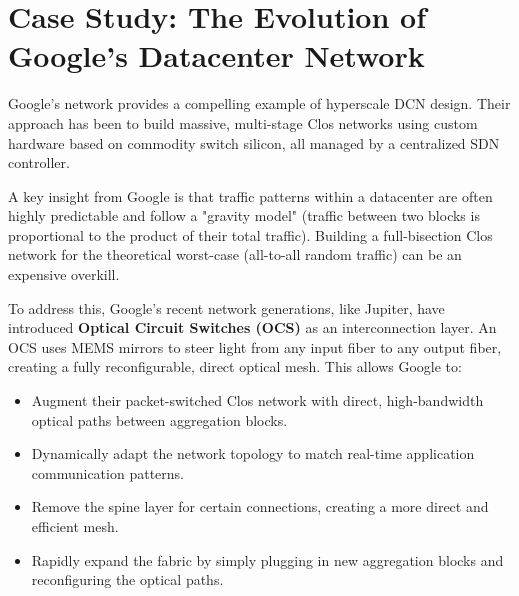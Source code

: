 \section{Case Study: The Evolution of Google's Datacenter Network}
Google's network provides a compelling example of hyperscale DCN design. Their approach has been to build massive, multi-stage Clos networks using custom hardware based on commodity switch silicon, all managed by a centralized SDN controller.


A key insight from Google is that traffic patterns within a datacenter are often highly predictable and follow a "gravity model" (traffic between two blocks is proportional to the product of their total traffic). Building a full-bisection Clos network for the theoretical worst-case (all-to-all random traffic) can be an expensive overkill.

To address this, Google's recent network generations, like Jupiter, have introduced \textbf{Optical Circuit Switches (OCS)} as an interconnection layer. An OCS uses MEMS mirrors to steer light from any input fiber to any output fiber, creating a fully reconfigurable, direct optical mesh. This allows Google to:
\begin{itemize}
    \item Augment their packet-switched Clos network with direct, high-bandwidth optical paths between aggregation blocks.
    \item Dynamically adapt the network topology to match real-time application communication patterns.
    \item Remove the spine layer for certain connections, creating a more direct and efficient mesh.
    \item Rapidly expand the fabric by simply plugging in new aggregation blocks and reconfiguring the optical paths.
\end{itemize}

